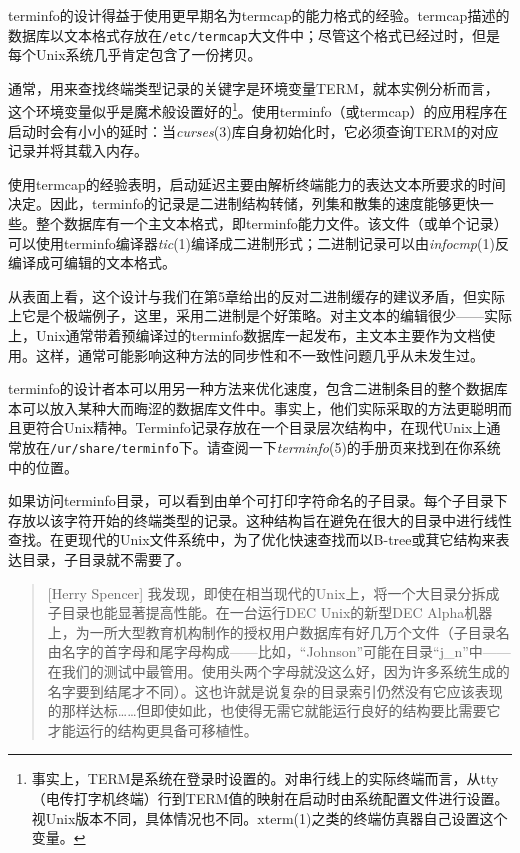 \documentclass[12pt,oneside]{ctexbook}
\begin{document}
\begin{common-format}
terminfo的设计得益于使用更早期名为termcap的能力格式的经验。termcap描述的数据库以文本格式存放在\verb+/etc/termcap+大文件中；尽管这个格式已经过时，但是每个Unix系统几乎肯定包含了一份拷贝。

通常，用来查找终端类型记录的关键字是环境变量TERM，就本实例分析而言，这个环境变量似乎是魔术般设置好的\footnote{事实上，TERM是系统在登录时设置的。对串行线上的实际终端而言，从tty（电传打字机终端）行到TERM值的映射在启动时由系统配置文件进行设置。视Unix版本不同，具体情况也不同。xterm(1)之类的终端仿真器自己设置这个变量。}。使用terminfo（或termcap）的应用程序在启动时会有小小的延时：当\textit{curses}(3)库自身初始化时，它必须查询TERM的对应记录并将其载入内存。

使用termcap的经验表明，启动延迟主要由解析终端能力的表达文本所要求的时间决定。因此，terminfo的记录是二进制结构转储，列集和散集的速度能够更快一些。整个数据库有一个主文本格式，即terminfo能力文件。该文件（或单个记录）可以使用terminfo编译器\textit{tic}(1)编译成二进制形式；二进制记录可以由\textit{infocmp}(1)反编译成可编辑的文本格式。

从表面上看，这个设计与我们在第5章给出的反对二进制缓存的建议矛盾，但实际上它是个极端例子，这里，采用二进制是个好策略。对主文本的编辑很少——实际上，Unix通常带着预编译过的terminfo数据库一起发布，主文本主要作为文档使用。这样，通常可能影响这种方法的同步性和不一致性问题几乎从未发生过。

terminfo的设计者本可以用另一种方法来优化速度，包含二进制条目的整个数据库本可以放入某种大而晦涩的数据库文件中。事实上，他们实际采取的方法更聪明而且更符合Unix精神。Terminfo记录存放在一个目录层次结构中，在现代Unix上通常放在\verb+/ur/share/terminfo+下。请查阅一下\textit{terminfo}(5)的手册页来找到在你系统中的位置。

如果访问terminfo目录，可以看到由单个可打印字符命名的子目录。每个子目录下存放以该字符开始的终端类型的记录。这种结构旨在避免在很大的目录中进行线性查找。在更现代的Unix文件系统中，为了优化快速查找而以B-tree或萁它结构来表达目录，子目录就不需要了。

\begin{quote}[Herry Spencer]
我发现，即使在相当现代的Unix上，将一个大目录分拆成子目录也能显著提高性能。在一台运行DEC Unix的新型DEC Alpha机器上，为一所大型教育机构制作的授权用户数据库有好几万个文件（子目录名由名字的首字母和尾字母构成——比如，“Johnson”可能在目录“j\_{}n”中——在我们的测试中最管用。使用头两个字母就没这么好，因为许多系统生成的名字要到结尾才不同）。这也许就是说复杂的目录索引仍然没有它应该表现的那样达标……但即使如此，也使得无需它就能运行良好的结构要比需要它才能运行的结构更具备可移植性。
\end{quote}


\end{common-format}
\end{document}
